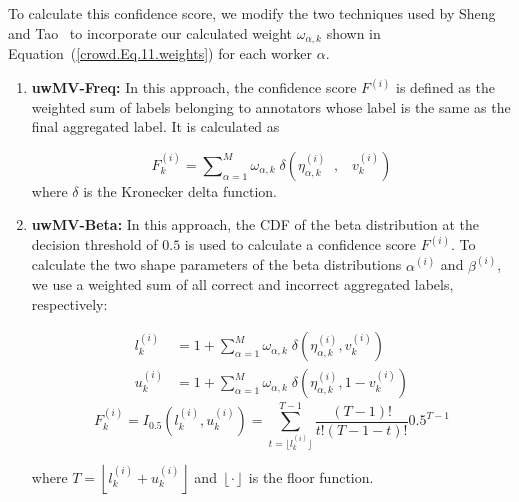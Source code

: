 To calculate this confidence score, we modify the two techniques used by Sheng~\cite{sheng_Majority_2019} and Tao~\cite{tao_Label_2020} to incorporate our calculated weight $\omega_{\alpha,k} $ shown in Equation~(\ref{crowd.Eq.11.weights})  for each worker $\alpha $.

\begin{enumerate}
    \item \textbf{uwMV-Freq:} In this approach, the confidence score $F^{(i)} $ is defined as the weighted sum of labels belonging to annotators whose label is the same as the final aggregated label. It is calculated as

    \begin{equation}
        F_k^{(i)}={\sum\nolimits_{\alpha=1}^{M}{\omega_{\alpha,k}\;\delta\left(\eta_{\alpha,k}^{(i)}\;\;,\;\;\;v_k^{(i)}\right)}}
        \label{crowd.Eq.13.confidence-score.freq}
    \end{equation}
    where $\delta $ is the Kronecker delta function.


    \item \textbf{uwMV-Beta:} In this approach, the CDF of the beta distribution at the decision threshold of $0.5 $ is used to calculate a confidence score $F^{(i)} $. To calculate the two shape parameters of the beta distributions $\alpha^{(i)} $ and $\beta^{(i)} $, we use a weighted sum of all correct and incorrect aggregated labels, respectively:

    \begin{equation}
        \begin{aligned}
            l_k^{(i)} &= 1 + \sum_{\alpha=1}^{M} \omega_{\alpha,k} \; \delta\left(\eta_{\alpha,k}^{(i)}, v_{k}^{(i)}\right) \\
            u_k^{(i)} &= 1 + \sum_{\alpha=1}^{M} \omega_{\alpha,k} \; \delta\left(\eta_{\alpha,k}^{(i)}, 1 - v_{k}^{(i)}\right)
        \end{aligned}
        \label{crowd.Eq.14.beta_l_u}
    \end{equation}
    \begin{equation}
        F_k^{(i)}=I_{0.5}\left(l_k^{(i)},u_k^{(i)}\right)=\sum_{t=\lfloor l_k^{(i)}\rfloor}^{T-1}\frac{(T-1)!}{t!(T-1-t)!}0.5^{T-1}
        \label{crowd.Eq.15.confidence-score.beta}
    \end{equation}

    where $T=\left\lfloor l_k^{(i)} + u_k^{(i)}\right\rfloor $ and $\left\lfloor\cdot\right\rfloor $ is the floor function.

\end{enumerate}



